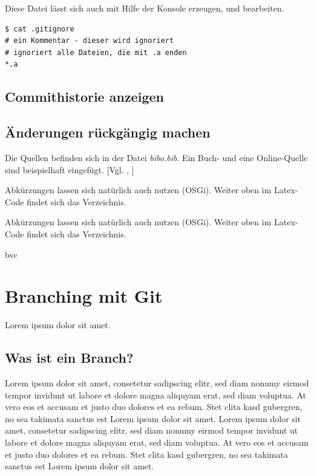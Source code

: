 \documentclass[12pt,a4paper,bibliography=totocnumbered,listof=totocnumbered]{scrartcl}
\begin{document}
Diese Datei lässt sich auch mit Hilfe der Konsole erzeugen, und bearbeiten.
\vspace{1em}
\begin{lstlisting}[caption=Git Erstellen der.gitignore Datei, label=lst:arduino]
$ cat .gitignore
# ein Kommentar - dieser wird ignoriert
# ignoriert alle Dateien, die mit .a enden
*.a
\end{lstlisting}

\subsection{Commithistorie anzeigen}
\subsection{ Änderungen rückgängig machen}
Die Quellen befinden sich in der Datei \textit{bibo.bib}. Ein Buch- und eine Online-Quelle sind beispielhaft eingefügt. [Vgl. \cite{buch}, \cite{online}]

Abkürzungen lassen sich natürlich auch nutzen (\ac{OSGi}). Weiter oben im Latex-Code findet sich das Verzeichnis.


Abkürzungen lassen sich natürlich auch nutzen (\ac{OSGi}). Weiter oben im Latex-Code findet sich das Verzeichnis.
\begin{scriptsize}
bvc
\end{scriptsize}
\pagebreak

\section{Branching mit Git}
Lorem ipsum dolor sit amet.

\subsection{Was ist ein Branch?}
Lorem ipsum dolor sit amet, consetetur sadipscing elitr, sed diam nonumy eirmod tempor invidunt ut labore et dolore magna aliquyam erat, sed diam voluptua. At vero eos et accusam et justo duo dolores et ea rebum. Stet clita kasd gubergren, no sea takimata sanctus est Lorem ipsum dolor sit amet. Lorem ipsum dolor sit amet, consetetur sadipscing elitr, sed diam nonumy eirmod tempor invidunt ut labore et dolore magna aliquyam erat, sed diam voluptua. At vero eos et accusam et justo duo dolores et ea rebum. Stet clita kasd gubergren, no sea takimata sanctus est Lorem ipsum dolor sit amet.
\end{document}
